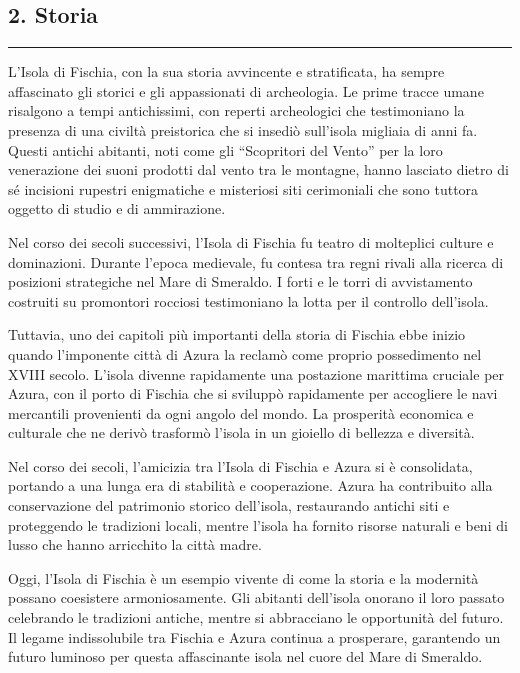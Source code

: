 \subsection{2. Storia}\label{storia}

\begin{center}\rule{0.5\linewidth}{0.5pt}\end{center}

L'Isola di Fischia, con la sua storia avvincente e stratificata, ha
sempre affascinato gli storici e gli appassionati di archeologia. Le
prime tracce umane risalgono a tempi antichissimi, con reperti
archeologici che testimoniano la presenza di una civiltà preistorica che
si insediò sull'isola migliaia di anni fa. Questi antichi abitanti, noti
come gli ``Scopritori del Vento'' per la loro venerazione dei suoni
prodotti dal vento tra le montagne, hanno lasciato dietro di sé
incisioni rupestri enigmatiche e misteriosi siti cerimoniali che sono
tuttora oggetto di studio e di ammirazione.

Nel corso dei secoli successivi, l'Isola di Fischia fu teatro di
molteplici culture e dominazioni. Durante l'epoca medievale, fu contesa
tra regni rivali alla ricerca di posizioni strategiche nel Mare di
Smeraldo. I forti e le torri di avvistamento costruiti su promontori
rocciosi testimoniano la lotta per il controllo dell'isola.

Tuttavia, uno dei capitoli più importanti della storia di Fischia ebbe
inizio quando l'imponente città di Azura la reclamò come proprio
possedimento nel XVIII secolo. L'isola divenne rapidamente una
postazione marittima cruciale per Azura, con il porto di Fischia che si
sviluppò rapidamente per accogliere le navi mercantili provenienti da
ogni angolo del mondo. La prosperità economica e culturale che ne derivò
trasformò l'isola in un gioiello di bellezza e diversità.

Nel corso dei secoli, l'amicizia tra l'Isola di Fischia e Azura si è
consolidata, portando a una lunga era di stabilità e cooperazione. Azura
ha contribuito alla conservazione del patrimonio storico dell'isola,
restaurando antichi siti e proteggendo le tradizioni locali, mentre
l'isola ha fornito risorse naturali e beni di lusso che hanno arricchito
la città madre.

Oggi, l'Isola di Fischia è un esempio vivente di come la storia e la
modernità possano coesistere armoniosamente. Gli abitanti dell'isola
onorano il loro passato celebrando le tradizioni antiche, mentre si
abbracciano le opportunità del futuro. Il legame indissolubile tra
Fischia e Azura continua a prosperare, garantendo un futuro luminoso per
questa affascinante isola nel cuore del Mare di Smeraldo.

